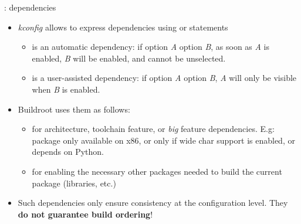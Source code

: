 \begin{frame}{: dependencies}
  \begin{itemize}
  \item {\em kconfig} allows to express dependencies using
     or  statements
    \begin{itemize}
    \item {} is an automatic dependency: if option {\em A}
       option {\em B}, as soon as {\em A} is enabled,
      {\em B} will be enabled, and cannot be unselected.
    \item {} is a user-assisted dependency: if option
      {\em A}  option {\em B}, {\em A} will only be
      visible when {\em B} is enabled.
    \end{itemize}
  \item Buildroot uses them as follows:
    \begin{itemize}
    \item {} for architecture, toolchain feature, or
      {\em big} feature dependencies. E.g: package only available on
      x86, or only if wide char support is enabled, or depends on
      Python.
    \item {} for enabling the necessary other packages
      needed to build the current package (libraries, etc.)
    \end{itemize}
  \item Such dependencies only ensure consistency at the configuration
    level. They {\bf do not guarantee build ordering}!
  \end{itemize}
\end{frame}

